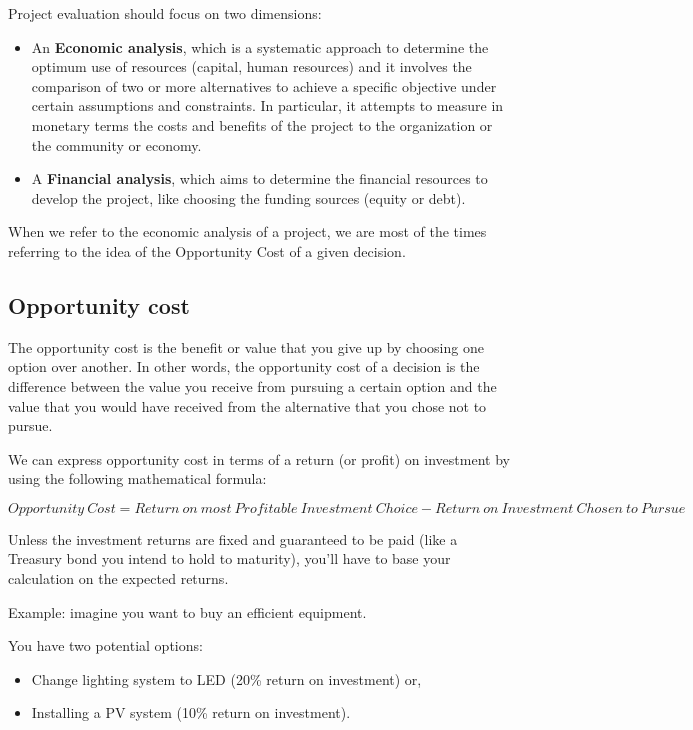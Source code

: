 \documentclass[]{book}
\providecommand{\tightlist}{%
  \setlength{\itemsep}{0pt}\setlength{\parskip}{0pt}}
\theoremstyle{definition}
\theoremstyle{definition}
\theoremstyle{definition}
\theoremstyle{remark}
\begin{document}
Project evaluation should focus on two dimensions:

\begin{itemize}
\item
  An \textbf{Economic analysis}, which is a systematic approach to
  determine the optimum use of resources (capital, human resources) and
  it involves the comparison of two or more alternatives to achieve a
  specific objective under certain assumptions and constraints. In
  particular, it attempts to measure in monetary terms the costs and
  benefits of the project to the organization or the community or
  economy.
\item
  A \textbf{Financial analysis}, which aims to determine the financial
  resources to develop the project, like choosing the funding sources
  (equity or debt).
\end{itemize}

When we refer to the economic analysis of a project, we are most of the
times referring to the idea of the Opportunity Cost of a given decision.

\subsection{Opportunity cost}\label{opportunity-cost}

The opportunity cost is the benefit or value that you give up by
choosing one option over another. In other words, the opportunity cost
of a decision is the difference between the value you receive from
pursuing a certain option and the value that you would have received
from the alternative that you chose not to pursue.

We can express opportunity cost in terms of a return (or profit) on
investment by using the following mathematical formula:

\[Opportunity \ Cost = Return \ on \ most \  Profitable \ Investment \ Choice - Return \ on \ Investment \  Chosen  \ to  \ Pursue\]

Unless the investment returns are fixed and guaranteed to be paid (like
a Treasury bond you intend to hold to maturity), you'll have to base
your calculation on the expected returns.

Example: imagine you want to buy an efficient equipment.

You have two potential options:

\begin{itemize}
\tightlist
\item
  Change lighting system to LED (20\% return on investment) or,
\item
  Installing a PV system (10\% return on investment).
\end{itemize}
\end{document}
